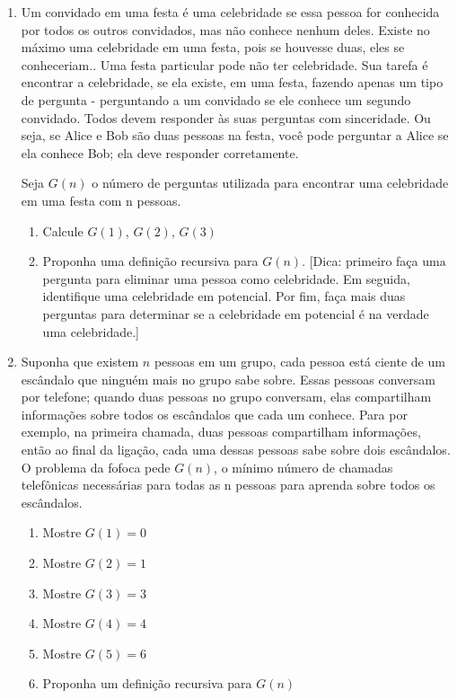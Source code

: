 \begin{enumerate}
\item 

Um convidado em uma festa é uma celebridade se essa pessoa for conhecida por todos os outros convidados, mas não conhece nenhum deles. Existe no máximo uma celebridade em uma festa, pois se houvesse duas, eles se conheceriam.. Uma festa particular pode não ter celebridade. Sua tarefa é encontrar a celebridade, se ela
existe, em uma festa, fazendo apenas um tipo de pergunta - perguntando a um convidado se ele conhece um segundo convidado. Todos devem responder às suas perguntas com sinceridade. Ou seja, se Alice e Bob são duas pessoas na festa, você pode perguntar a Alice se ela conhece Bob; ela deve responder corretamente.

Seja $G(n)$ o número de perguntas utilizada para encontrar uma celebridade em uma festa com n pessoas.

\begin{enumerate}
    \item Calcule $G(1)$, $G(2)$, $G(3)$
    \item Proponha uma definição recursiva para $G(n)$. [Dica: primeiro faça uma pergunta para eliminar uma pessoa como celebridade. Em seguida, identifique  uma celebridade em potencial. Por fim, faça mais duas perguntas para determinar se a celebridade em potencial é na verdade uma celebridade.]
\end{enumerate}


\item 

Suponha que existem $n$ pessoas em um grupo, cada pessoa está ciente de um escândalo que
ninguém mais no grupo sabe sobre. Essas pessoas conversam por telefone; quando duas pessoas no grupo conversam, elas compartilham informações sobre todos os escândalos que cada um conhece. Para
por exemplo, na primeira chamada, duas pessoas compartilham informações, então
ao final da ligação, cada uma dessas pessoas sabe sobre dois escândalos. O problema da fofoca pede $G(n)$, o mínimo número de chamadas telefônicas necessárias para todas as n pessoas para
aprenda sobre todos os escândalos. 

\begin{enumerate}
    \item Mostre $G(1) = 0$
    \item Mostre $G(2) = 1$
    \item Mostre $G(3) = 3$
    \item Mostre $G(4) = 4$
    \item Mostre $G(5) = 6$
    \item Proponha um definição recursiva para $G(n)$
    
    
\end{enumerate}

\end{enumerate}













